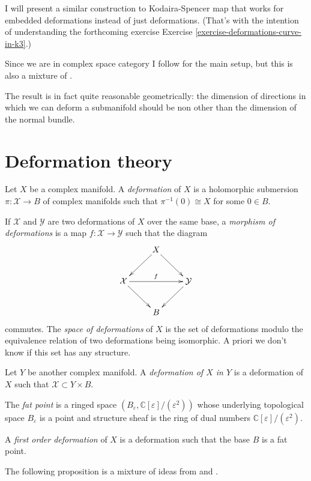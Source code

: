 I will present a similar construction
to Kodaira-Spencer map
that works for embedded deformations
instead of just deformations.
(That's with the intention of understanding the
forthcoming exercise Exercise \ref{exercise-deformations-curve-in-k3}.)

Since we are in complex space category
I follow \cite[p. 224]{Voisin} for the main setup,
but this is also a mixture
of \cite[p. 147, 150]{Sernesi}.

The result is in fact quite reasonable geometrically:
the dimension of directions in which we can deform a
submanifold should be non other than
the dimension of the normal bundle.

\section{Deformation theory}
\label{section-deformation-theory}

\begin{definition}
\label{definition-deformation}
Let $X$ be a complex manifold.
A {\it deformation} of $X$ is a holomorphic submersion
$\pi:\mathcal{X} \to B$ of complex manifolds
such that $\pi^{-1}(0)\cong X$ for some $0 \in B$.

If $\mathcal{X}$ and $\mathcal{Y}$ are two deformations
of $X$ over the same base,
a {\it morphism of deformations} is a map
$f:\mathcal{X} \to \mathcal{Y}$ such that the diagram
$$
\xymatrix{
& X\ar[dl]\ar[dr]\\
\mathcal{X}\ar[dr]\ar[rr]^f&&\mathcal{Y}\ar[dl]\\
&B
}
$$
commutes. The {\it space of deformations} of $X$
is the set of deformations modulo
the equivalence relation of two deformations
being isomorphic. A priori we don't know
if this set has any structure.

Let $Y$ be another complex manifold.
A {\it deformation of $X$ in $Y$} 
is a deformation of $X$ such that $\mathcal{X}\subset Y\times B$.

The {\it fat point} is a ringed space 
$(B_\varepsilon,\mathbb{C}[\varepsilon]/(\varepsilon^2))$
whose underlying topological space $B_\varepsilon$ is a point
and structure sheaf is the ring of dual numbers
$\mathbb{C}[\varepsilon]/(\varepsilon^2)$.

A {\it first order deformation} of $X$ is a deformation such that
the base $B$ is a fat point.
\end{definition}

The following proposition is a
mixture of ideas from \cite[p. 224]{Voisin}
and \cite[Examples 3.2.4(ii)]{Sernesi-deformations}.

